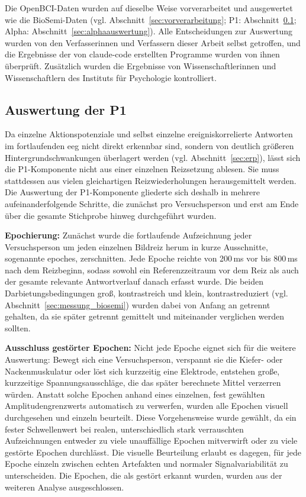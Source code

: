 Die OpenBCI-Daten wurden auf dieselbe Weise vorverarbeitet und ausgewertet wie die BioSemi-Daten (vgl. Abschnitt~\ref{sec:vorverarbeitung}; P1: Abschnitt~\ref{sec:p1auswertung}; Alpha: Abschnitt~\ref{sec:alphaauswertung}). Alle Entscheidungen zur Auswertung wurden von den Verfasserinnen und Verfassern dieser Arbeit selbst
getroffen, und die Ergebnisse der von \gls{claude-code} erstellten Programme
wurden von ihnen überprüft. Zusätzlich wurden die Ergebnisse von
Wissenschaftlerinnen und Wissenschaftlern des Instituts für Psychologie
kontrolliert.

\subsection{Auswertung der P1}
\label{sec:p1auswertung}

Da einzelne Aktionspotenziale und selbst einzelne ereigniskorrelierte Antworten im fortlaufenden \acrshort{eeg} nicht direkt erkennbar sind, sondern von deutlich größeren Hintergrundschwankungen überlagert werden (vgl. Abschnitt~\ref{sec:erp}), lässt sich die P1-Komponente nicht aus einer einzelnen Reizsetzung ablesen. Sie muss stattdessen aus vielen gleichartigen Reizwiederholungen herausgemittelt werden. Die Auswertung der P1-Komponente gliederte sich deshalb in mehrere aufeinanderfolgende Schritte, die zunächst pro Versuchsperson und erst am Ende über die gesamte Stichprobe hinweg durchgeführt wurden.

\textbf{Epochierung:} Zunächst wurde die fortlaufende Aufzeichnung jeder Versuchsperson um jeden einzelnen Bildreiz herum in kurze Ausschnitte, sogenannte \glspl{epoche}, zerschnitten. Jede Epoche reichte von 200\,ms vor bis 800\,ms nach dem Reizbeginn, sodass sowohl ein Referenzzeitraum vor dem Reiz als auch der gesamte relevante Antwortverlauf danach erfasst wurde. Die beiden Darbietungsbedingungen groß, kontrastreich und klein, kontrastreduziert (vgl. Abschnitt~\ref{sec:messung_biosemi}) wurden dabei von Anfang an getrennt gehalten, da sie später getrennt gemittelt und miteinander verglichen werden sollten.

\textbf{Ausschluss gestörter Epochen:} Nicht jede Epoche eignet sich für die weitere Auswertung: Bewegt sich eine Versuchsperson, verspannt sie die Kiefer- oder Nackenmuskulatur oder löst sich kurzzeitig eine Elektrode, entstehen große, kurzzeitige Spannungsausschläge, die das später berechnete Mittel verzerren würden. Anstatt solche Epochen anhand eines einzelnen, fest gewählten Amplitudengrenzwerts automatisch zu verwerfen, wurden alle Epochen visuell durchgesehen und einzeln beurteilt. Diese Vorgehensweise wurde gewählt, da ein fester Schwellenwert bei realen, unterschiedlich stark verrauschten Aufzeichnungen entweder zu viele unauffällige Epochen mitverwirft oder zu viele gestörte Epochen durchlässt. Die visuelle Beurteilung erlaubt es dagegen, für jede Epoche einzeln zwischen echten Artefakten und normaler Signalvariabilität zu unterscheiden. Die Epochen, die als gestört erkannt wurden, wurden aus der weiteren Analyse ausgeschlossen. 

